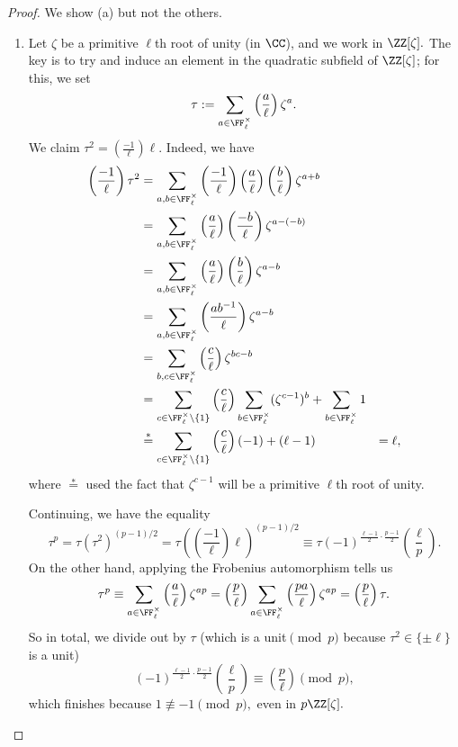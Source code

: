 \documentclass[../notes.tex]{subfiles}
\begin{document}
\begin{proof}
	We show (a) but not the others.
	\begin{enumerate}[label=(\alph*)]
		\item Let $\zeta$ be a primitive $\ell$th root of unity (in $\CC$), and we work in $\ZZ[\zeta].$ The key is to try and induce an element in the quadratic subfield of $\ZZ[\zeta]$; for this, we set
		\[\tau:=\sum_{a\in\FF_\ell^\times}\left(\frac a\ell\right)\zeta^a.\]
		We claim $\tau^2=\left(\frac{-1}\ell\right)\ell.$ Indeed, we have
		\begin{align*}
			\left(\frac{-1}\ell\right)\tau^2 &= \sum_{a,b\in\FF_\ell^\times}\left(\frac{-1}\ell\right)\left(\frac a\ell\right)\left(\frac b\ell\right)\zeta^{a+b} \\
			&= \sum_{a,b\in\FF_\ell^\times}\left(\frac {a}\ell\right)\left(\frac {-b}\ell\right)\zeta^{a-(-b)} \\
			&= \sum_{a,b\in\FF_\ell^\times}\left(\frac {a}\ell\right)\left(\frac b\ell\right)\zeta^{a-b} \\
			&= \sum_{a,b\in\FF_\ell^\times}\left(\frac {ab^{-1}}\ell\right)\zeta^{a-b} \\
			&= \sum_{b,c\in\FF_\ell^\times}\left(\frac c\ell\right)\zeta^{bc-b} \\
			&= \sum_{c\in\FF_\ell^\times\setminus\{1\}}\left(\frac c\ell\right)\sum_{b\in\FF_\ell^\times}(\zeta^{c-1})^b+\sum_{b\in\FF_\ell^\times}1 \\
			&\stackrel*= \sum_{c\in\FF_\ell^\times\setminus\{1\}}\left(\frac c\ell\right)(-1)+(\ell-1)
			&= \ell,
		\end{align*}
		where $\stackrel*=$ used the fact that $\zeta^{c-1}$ will be a primitive $\ell$th root of unity.

		Continuing, we have the equality
		\[\tau^p=\tau\left(\tau^2\right)^{(p-1)/2}=\tau\left(\left(\frac{-1}\ell\right)\ell\right)^{(p-1)/2}\equiv\tau(-1)^{\frac{\ell-1}2\cdot\frac{p-1}2}\left(\frac\ell p\right).\]
		On the other hand, applying the Frobenius automorphism tells us
		\[\tau^p\equiv\sum_{a\in\FF_\ell^\times}\left(\frac a\ell\right)\zeta^{ap}=\left(\frac p\ell\right)\sum_{a\in\FF_\ell^\times}\left(\frac{pa}\ell\right)\zeta^{ap}=\left(\frac p\ell\right)\tau.\]
		So in total, we divide out by $\tau$ (which is a unit$\pmod p$ because $\tau^2\in\{\pm\ell\}$ is a unit)
		\[(-1)^{\frac{\ell-1}2\cdot\frac{p-1}2}\left(\frac\ell p\right)\equiv\left(\frac p\ell\right)\pmod p,\]
		which finishes because $1\not\equiv-1\pmod p,$ even in $p\ZZ[\zeta].$
		\qedhere
	\end{enumerate}
\end{proof}
\end{document}
